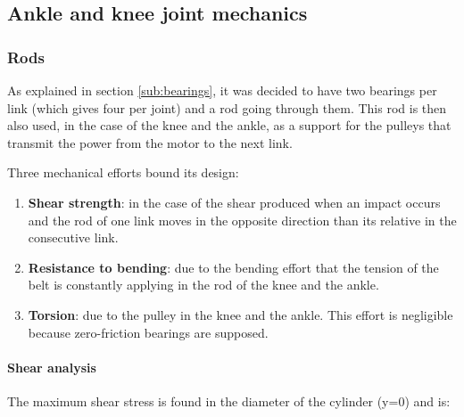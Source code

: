 
\subsection{Ankle and knee joint mechanics} %
\label{sub:hip_and_knee_joint_mechanics}

\subsubsection{Rods} %
\label{ssub:rods}
As explained in section \ref{sub:bearings}, it was decided to have two bearings per link (which gives four per joint) and a rod going through them.
This rod is then also used, in the case of the knee and the ankle, as a support for the pulleys that transmit the power from the motor to the next link.

Three mechanical efforts bound its design:
\begin{enumerate}
  \item \textbf{Shear strength}: in the case of the shear produced when an impact occurs and the rod of one link moves in the opposite direction than its relative in the consecutive link.
  \item \textbf{Resistance to bending}: due to the bending effort that the tension of the belt is constantly applying in the rod of the  knee and the ankle.
  \item \textbf{Torsion}: due to the pulley in the knee and the ankle. 
  This effort is negligible because zero-friction bearings are supposed.
\end{enumerate}

  \paragraph{Shear analysis} %
  \label{ssub:shear_analysis}
  The maximum shear stress is found in the diameter of the cylinder (y=0) and is:
  

